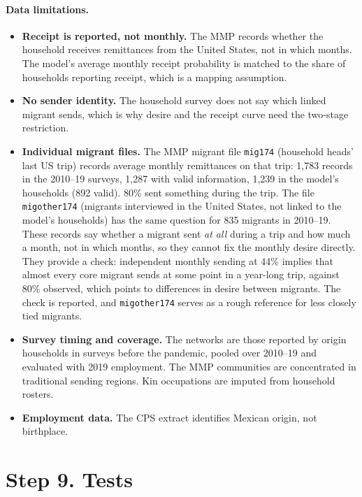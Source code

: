 \documentclass[11pt]{article}
\begin{document}
\paragraph{Data limitations.}
\begin{itemize}[leftmargin=*]
\item \textbf{Receipt is reported, not monthly.} The MMP records whether the household receives remittances from the United States, not in which months. The model's average monthly receipt probability is matched to the share of households reporting receipt, which is a mapping assumption.
\item \textbf{No sender identity.} The household survey does not say which linked migrant sends, which is why desire and the receipt curve need the two-stage restriction.
\item \textbf{Individual migrant files.} The MMP migrant file \texttt{mig174} (household heads' last US trip) records average monthly remittances on that trip: 1,783 records in the 2010--19 surveys, 1,287 with valid information, 1,239 in the model's households (892 valid). 80\% sent something during the trip. The file \texttt{migother174} (migrants interviewed in the United States, not linked to the model's households) has the same question for 835 migrants in 2010--19. These records say whether a migrant sent \emph{at all} during a trip and how much a month, not in which months, so they cannot fix the monthly desire directly. They provide a check: independent monthly sending at 44\% implies that almost every core migrant sends at some point in a year-long trip, against 80\% observed, which points to differences in desire between migrants. The check is reported, and \texttt{migother174} serves as a rough reference for less closely tied migrants.
\item \textbf{Survey timing and coverage.} The networks are those reported by origin households in surveys before the pandemic, pooled over 2010--19 and evaluated with 2019 employment. The MMP communities are concentrated in traditional sending regions. Kin occupations are imputed from household rosters.
\item \textbf{Employment data.} The CPS extract identifies Mexican origin, not birthplace.
\end{itemize}

\section*{Step 9. Tests}
\end{document}

